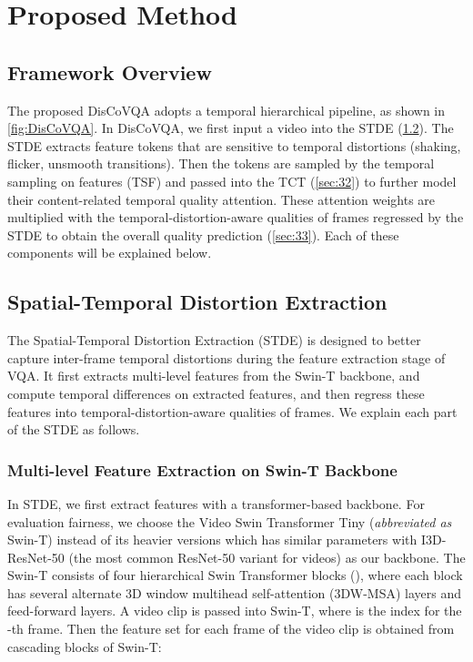 \documentclass[journal]{IEEEtran}
\begin{document}
\section{Proposed Method}


\subsection{Framework Overview}
The proposed DisCoVQA adopts a temporal hierarchical pipeline, as shown in \cref{fig:DisCoVQA}. In DisCoVQA, we first input a video into the STDE (\cref{sec:31}). The STDE extracts feature tokens that are sensitive to temporal distortions (shaking, flicker, unsmooth transitions). Then the tokens are sampled by the temporal sampling on features (TSF) and passed into the TCT (\cref{sec:32}) to further model their content-related temporal quality attention. These attention weights are multiplied with the temporal-distortion-aware qualities of frames regressed by the STDE to obtain the overall quality prediction (\cref{sec:33}). Each of these components will be explained below.   


\subsection{Spatial-Temporal Distortion Extraction} \label{sec:31}

The Spatial-Temporal Distortion Extraction (STDE) is designed to better capture inter-frame temporal distortions during the feature extraction stage of VQA. It first extracts multi-level features from the Swin-T backbone, and compute temporal differences on extracted features, and then regress these features into temporal-distortion-aware qualities of frames. We explain each part of the STDE as follows.

\subsubsection{Multi-level Feature Extraction on Swin-T Backbone} In STDE, we first extract features with a transformer-based backbone. For evaluation fairness, we choose the Video Swin Transformer Tiny (\textit{abbreviated as} Swin-T) instead of its heavier versions which has similar parameters with I3D-ResNet-50\cite{k400} (the most common ResNet-50 variant for videos) as our backbone. The Swin-T consists of four hierarchical Swin Transformer blocks (), where each block has several alternate 3D window multihead self-attention (3DW-MSA) layers and feed-forward layers. A video clip  is passed into Swin-T, where  is the index for the -th frame. Then the feature set  for each frame of the video clip  is obtained from  cascading blocks of Swin-T:
\end{document}
